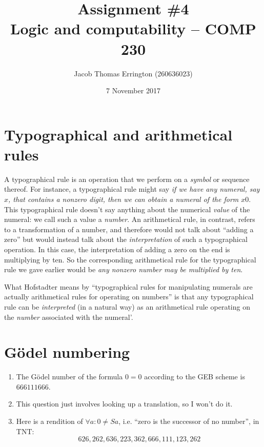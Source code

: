\documentclass[11pt,letterpaper]{article}
\author{Jacob Thomas Errington (260636023)}
\title{Assignment \#4\\Logic and computability -- COMP 230}
\date{7 November 2017}
\begin{document}
\maketitle

\section{Typographical and arithmetical rules}

A typographical rule is an operation that we perform on a \emph{symbol} or
sequence thereof. For instance, a typographical rule might say \emph{if we have
any numeral, say $x$, that contains a nonzero digit, then we can obtain a
numeral of the form $x0$}.
This typographical rule doesn't say anything about the numerical \emph{value}
of the numeral: we call such a value a \emph{number}.
An arithmetical rule, in contrast, refers to a transformation of a number, and
therefore would not talk about ``adding a zero'' but would instead talk about
the \emph{interpretation} of such a typographical operation.
In this case, the interpretation of adding a zero on the end is multiplying by
ten.
So the corresponding arithmetical rule for the typographical rule we gave
earlier would be \emph{any nonzero number may be multiplied by ten}.

What Hofstadter means by ``typographical rules for manipulating numerals are
actually arithmetical rules for operating on numbers'' is that any
typographical rule can be \emph{interpreted} (in a natural way) as an
arithmetical rule operating on the \emph{number} associated with the numeral'.

\section{Gödel numbering}

\begin{enumerate}
  \item
    The Gödel number of the formula $0 = 0$ according to the GEB scheme is
    $666111666$.

  \item
    This question just involves looking up a translation, so I won't do it.

  \item
    Here is a rendition of
    $\forall a: 0 \neq S a$, i.e. ``zero is the successor of no number'',
    in TNT:
    \begin{equation*}
      626,262,636,223,362,666,111,123,262
    \end{equation*}
\end{enumerate}
\end{document}
